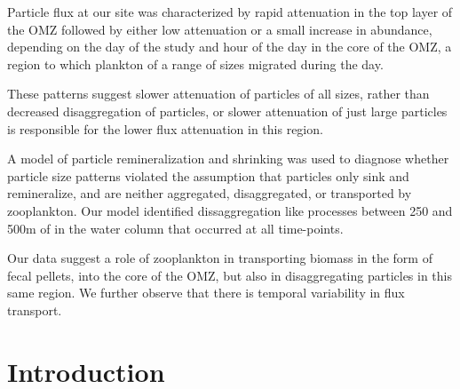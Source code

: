 \documentclass[]{article}
\begin{document}
Particle flux at our site was characterized by rapid attenuation in the
top layer of the OMZ followed by either low attenuation or a small
increase in abundance, depending on the day of the study and hour of the
day in the core of the OMZ, a region to which plankton of a range of
sizes migrated during the day.

These patterns suggest slower attenuation of particles of all sizes,
rather than decreased disaggregation of particles, or slower attenuation
of just large particles is responsible for the lower flux attenuation in
this region.

A model of particle remineralization and shrinking was used to diagnose
whether particle size patterns violated the assumption that particles
only sink and remineralize, and are neither aggregated, disaggregated,
or transported by zooplankton. Our model identified dissaggregation like
processes between 250 and 500m of in the water column that occurred at
all time-points.

Our data suggest a role of zooplankton in transporting biomass in the
form of fecal pellets, into the core of the OMZ, but also in
disaggregating particles in this same region. We further observe that
there is temporal variability in flux transport.

\hypertarget{introduction}{%
\section{Introduction}\label{introduction}}
\end{document}
